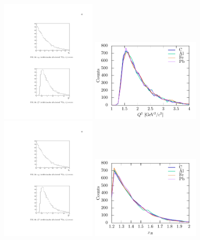 \documentclass{article}
\begin{document}
\begin{figure}[htpb]
\centering
\includegraphics[width=0.43\textwidth]{or_note_figs/q2.pdf}
\includegraphics[width=0.49\textwidth]{leading_dist/leading_QSq.pdf}\\
\includegraphics[width=0.43\textwidth]{or_note_figs/xB.pdf}
\includegraphics[width=0.49\textwidth]{leading_dist/leading_xB.pdf}\\

\end{figure}
\end{document}
